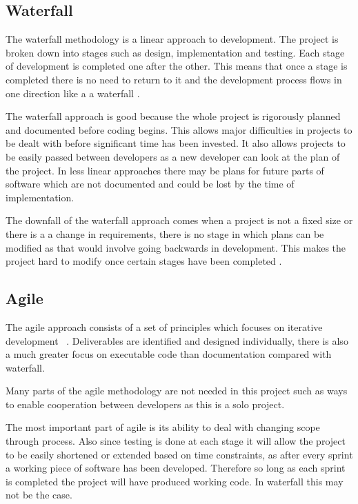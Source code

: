 \documentclass{UoYCSproject}
\begin{document}
\subsection{Waterfall}
The waterfall methodology is a linear approach to development. The project is broken down into stages such as design, implementation and testing. Each stage of development is completed one after the other. This means that once a stage is completed there is no need to return to it and the development process flows in one direction like a a waterfall \parencite{royce1987managing}.

The waterfall approach is good because the whole project is rigorously planned and documented before coding begins. This allows major difficulties in projects to be dealt with before significant time has been invested. It also allows projects to be easily passed between developers as a new developer can look at the plan of the project. In less linear approaches there may be plans for future parts of software which are not documented and could be lost by the time of implementation.

The downfall of the waterfall approach comes when a project is not a fixed size or there is a a change in requirements, there is no stage in which plans can be modified as that would involve going backwards in development. This makes the project hard to modify once certain stages have been completed .


\subsection{Agile}
The agile approach consists of a set of principles which focuses on iterative development ~\parencite{beck2001agile}. Deliverables are identified and designed individually, there is also a much greater focus on executable code than documentation compared with waterfall.

Many parts of the agile methodology are not needed in this project such as ways to enable cooperation between developers as this is a solo project.

The most important part of agile is its ability to deal with changing scope through process. Also since testing is done at each stage it will allow the project to be easily shortened or extended based on time constraints, as after every sprint a working piece of software has been developed. Therefore so long as each sprint is completed the project will have produced working code. In waterfall this may not be the case.
\end{document}
